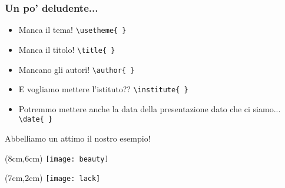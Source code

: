 \begin{frame}
 
 \frametitle{Un po' deludente...}
 
 \begin{itemize}
  \item<1-> Manca il tema! \texttt{\textbackslash usetheme\{ \}}
  \item<2-> Manca il titolo! \texttt{\textbackslash title\{ \}}
  \item<3-> Mancano gli autori! \texttt{\textbackslash author\{ \}}
  \item<4-> E vogliamo mettere l'istituto?? \texttt{\textbackslash institute\{ 
\}}
  \item<5-> Potremmo mettere anche la data della presentazione dato che ci 
siamo... 
\texttt{\textbackslash date\{ \}}
 \end{itemize}
 
 Abbelliamo un attimo il nostro esempio!
 
 \begin{textblock*}{4cm}(8cm,6cm)
    \texttt{[image: beauty]}
 \end{textblock*}
 
 
 \begin{textblock*}{5cm}(7cm,2cm)
    \texttt{[image: lack]}
 \end{textblock*}

\end{frame}
 
